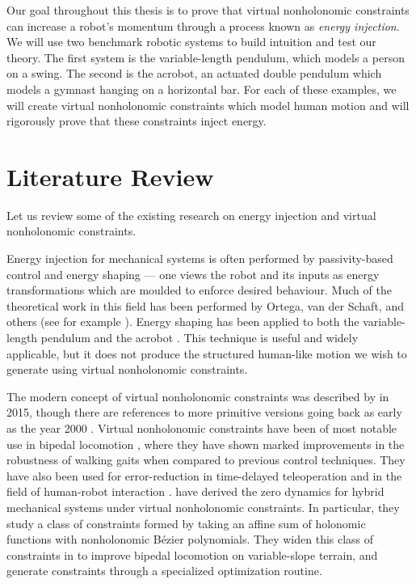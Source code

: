 Our goal throughout this thesis is to prove that virtual
nonholonomic constraints can increase a robot's momentum through a
process known as \textit{energy injection}.
We will use two benchmark robotic systems to build intuition and test
our theory.
The first system is the variable-length pendulum, which models a person
on a swing.
The second is the acrobot, an actuated double pendulum which models a gymnast
hanging on a horizontal bar.
For each of these examples, we will create virtual nonholonomic
constraints which model human motion and will rigorously prove that these
constraints inject energy. 

\section{Literature Review}
Let us review some of the existing research on energy injection and virtual
nonholonomic constraints.

Energy injection for mechanical systems is often performed by passivity-based
control and energy shaping --- one views the robot and its inputs as energy
transformations which are moulded to enforce desired behaviour.
Much of the theoretical work in this field has been performed by Ortega, van der
Schaft, and others (see for example \cite{ida_pbc_underactuation_one,
ida_pbc_acrobot_example,energy_shaping_revisited}).
Energy shaping has been applied to both the variable-length
pendulum \cite{vlp_energy_shaping} and the acrobot
\cite{swingup_acrobot_energy,swingup_giant_acrobot}.
This technique is useful and widely applicable, but it does not
produce the structured human-like motion we wish to generate using virtual
nonholonomic constraints.

The modern concept of virtual nonholonomic constraints was described by
\citet{nhvc_dynamic_walking} in 2015, though there are references to more
primitive versions going back as early as the year 2000
\cite{vnhc_human_robot_cooperation}.
Virtual nonholonomic constraints have been of most notable use in
bipedal locomotion 
\cite{nhvc_gait_optimization,output_nhvc_bipedal_control},
where they have shown marked improvements in the robustness of walking gaits
when compared to previous control techniques.
They have also been used for error-reduction in time-delayed teleoperation
\cite{vnhc_time_delay_teleop} and in the field of human-robot interaction
\cite{psd_based_vnhc_redundant_manipulator,haptic_vnhc}.
\citet{hybrid_zero_dynamics_bipedal_nhvcs} have derived the 
zero dynamics for hybrid mechanical systems under virtual nonholonomic
constraints.
In particular, they study a class of constraints formed by taking an affine
sum of holonomic functions with nonholonomic B\'{e}zier polynomials.
They widen this class of constraints in \cite{nhvc_incline_walking} to improve
bipedal locomotion on variable-slope terrain, and generate constraints through
a specialized optimization routine.

